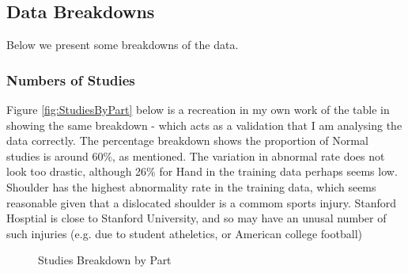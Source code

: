 \documentclass[11pt]{article} %
\theoremstyle{plain}
\theoremstyle{definition}
\begin{document}
\newpage
\subsection{Data Breakdowns} \label{MURA-Breakdowns}
Below we present some breakdowns of the data.
\subsubsection{Numbers of Studies}
Figure \ref{fig:StudiesByPart} below is a recreation in my own work of the table in \cite{MURA2017} showing the same breakdown - which acts as a validation that I am analysing the data correctly. The percentage breakdown shows the proportion of Normal studies is around 60\%, as mentioned. The variation in abnormal rate does not look too drastic, although 26\% for Hand in the training data perhaps seems low. Shoulder has the highest abnormality rate in the training data, which seems reasonable given that a dislocated shoulder is a commom sports injury. Stanford Hosptial is close to Stanford University, and so may have an unusal number of such injuries (e.g. due to student atheletics, or American college football)
\begin{figure}[!ht]
\centering
{}
\caption{Studies Breakdown by Part}
\label{fig:StudiesByPart_Breakdown}
\end{figure}
\end{document}
